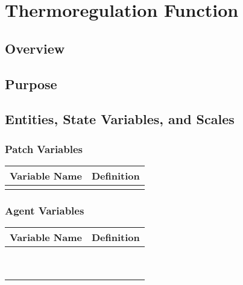 \documentclass[
]{book}
\begin{document}
\chapter{Thermoregulation Function}\label{thermoregulation-function}

\section{Overview}\label{overview-12}

\section{Purpose}\label{purpose-11}

\section{Entities, State Variables, and Scales}\label{entities-state-variables-and-scales-11}

\subsection{Patch Variables}\label{patch-variables-11}

\begin{longtable}[]{@{}ll@{}}
\toprule\noalign{}
Variable Name & Definition \\
\midrule\noalign{}
\endhead
\bottomrule\noalign{}
\endlastfoot
& \\
\end{longtable}

\subsection{Agent Variables}\label{agent-variables-11}

\begin{longtable}[]{@{}ll@{}}
\toprule\noalign{}
Variable Name & Definition \\
\midrule\noalign{}
\endhead
\bottomrule\noalign{}
\endlastfoot
& \\
& \\
& \\
& \\
& \\
& \\
& \\
& \\
& \\
\end{longtable}
\end{document}
